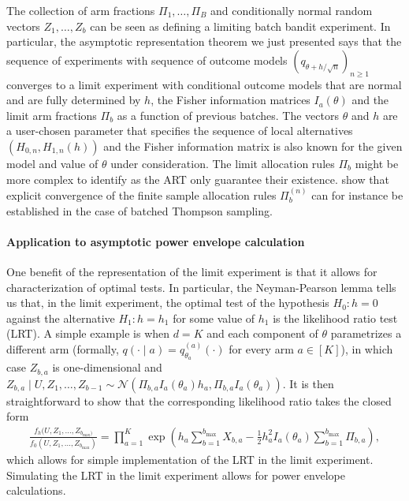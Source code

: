 The collection of arm fractions $\Pi_1,\ldots, \Pi_B$ and conditionally normal random vectors $Z_1,\ldots,Z_b$ can be seen as defining a limiting batch bandit experiment. In particular, the asymptotic representation theorem we just presented says that the sequence of experiments with sequence of outcome models $(q_{\theta+h / \sqrt{n}})_{n \geq 1}$ converges to a limit experiment with conditional outcome models that are normal and are fully determined by $h$, the Fisher information matrices $I_a(\theta)$ and the limit arm fractions $\Pi_b$ as a function of previous batches. The vectors $\theta$ and $h$ are a user-chosen parameter that specifies the sequence of local alternatives $(H_{0,n},H_{1,n}(h))$ and the Fisher information matrix is also known for the given model and value of $\theta$ under consideration. The limit allocation rules $\Pi_b$ might be more complex to identify as the ART only guarantee their existence. \cite{hirano2023asymptotic} show that explicit convergence of the finite sample allocation rules $\Pi_b^{(n)}$ can for instance be established in the case of batched Thompson sampling.


\paragraph{Application to asymptotic power envelope calculation}

One benefit of the representation of the limit experiment is that it allows for characterization of optimal tests. In particular, the Neyman-Pearson lemma tells us that, in the limit experiment, the optimal test of the hypothesis $H_0 : h= 0$ against the alternative $H_1 : h = h_1$ for some value of $h_1$ is the likelihood ratio test (LRT). A simple example is when $d = K$ and each component of $\theta$ parametrizes a different arm (formally,  $q(\cdot \mid a)  = q^{(a)}_{\theta_a}(\cdot)$ for every arm $a \in [K]$), in which case $Z_{b,a}$ is one-dimensional and $Z_{b,a} \mid U, Z_1,\ldots, Z_{b-1} \sim \mathcal{N}(\Pi_{b,a} I_a(\theta_a) h_a, \Pi_{b,a} I_a(\theta_a))$. It is then straightforward to show that the corresponding likelihood ratio takes the closed form
\begin{align*}
    \frac{f_h(U,Z_1,\ldots, Z_{b_{\max})}}{f_0(U,Z_1,\ldots, Z_{b_{\max}})} = \prod_{a=1}^K \exp \left( h_a \sum_{b=1}^{b_{\max}} X_{b,a}  - \frac{1}{2} h_a^2  I_a(\theta_a) \sum_{b=1}^{b_{\max}} \Pi_{b,a} \right),
\end{align*}
which allows for simple implementation of the LRT in the limit experiment.
Simulating the LRT in the limit experiment allows for power envelope calculations. 

